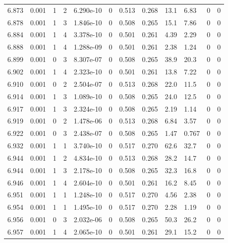 \documentclass[preview]{standalone}
\begin{document}
{{{{{{{{{{{{{{{{{{{\begin{tabular}{L{1.2cm}C{1.2cm} C{0.3cm}C{0.5cm} C{1.4cm}C{1.4cm} C{1.4cm}C{1.4cm} C{1.6cm}C{1.6cm} C{1.6cm}C{1.6cm}}
  6.873  &  0.001  & 1     &  2 &  6.290e-10  & 0  &  0.513&   0.268& 13.1 & 6.83   &  0 & 0  \\ 
  6.878  &  0.001  & 1     &  3 &  1.846e-10  & 0  &  0.508&   0.265& 15.1 & 7.86   &  0 & 0  \\ 
  6.884  &  0.001  & 1     &  4 &  3.378e-10  & 0  &  0.501&   0.261& 4.39 & 2.29   &  0 & 0  \\ 
  6.888  &  0.001  & 1     &  4 &  1.288e-09  & 0  &  0.501&   0.261& 2.38 & 1.24   &  0 & 0  \\ 
  6.899  &  0.001  & 0     &  3 &  8.307e-07  & 0  &  0.508&   0.265& 38.9 & 20.3   &  0 & 0  \\ 
  6.902  &  0.001  & 1     &  4 &  2.323e-10  & 0  &  0.501&   0.261& 13.8 & 7.22   &  0 & 0  \\ 
  6.910  &  0.001  & 0     &  2 &  2.504e-07  & 0  &  0.513&   0.268& 22.0 & 11.5   &  0 & 0  \\ 
  6.914  &  0.001  & 1     &  3 &  1.089e-10  & 0  &  0.508&   0.265& 24.0 & 12.5   &  0 & 0  \\ 
  6.917  &  0.001  & 1     &  3 &  2.324e-10  & 0  &  0.508&   0.265& 2.19 & 1.14   &  0 & 0  \\ 
  6.919  &  0.001  & 0     &  2 &  1.478e-06  & 0  &  0.513&   0.268& 6.84 & 3.57   &  0 & 0  \\ 
  6.922  &  0.001  & 0     &  3 &  2.438e-07  & 0  &  0.508&   0.265& 1.47 & 0.767   &  0 & 0  \\ 
  6.932  &  0.001  & 1     &  1 &  3.740e-10  & 0  &  0.517&   0.270& 62.6 & 32.7   &  0 & 0  \\ 
  6.944  &  0.001  & 1     &  2 &  4.834e-10  & 0  &  0.513&   0.268& 28.2 & 14.7   &  0 & 0  \\ 
  6.944  &  0.001  & 1     &  3 &  2.178e-10  & 0  &  0.508&   0.265& 32.3 & 16.8   &  0 & 0  \\ 
  6.946  &  0.001  & 1     &  4 &  2.604e-10  & 0  &  0.501&   0.261& 16.2 & 8.45   &  0 & 0  \\ 
  6.951  &  0.001  & 1     &  1 &  1.248e-10  & 0  &  0.517&   0.270& 4.56 & 2.38   &  0 & 0  \\ 
  6.954  &  0.001  & 1     &  1 &  1.495e-10  & 0  &  0.517&   0.270& 2.28 & 1.19   &  0 & 0  \\ 
  6.956  &  0.001  & 0     &  3 &  2.032e-06  & 0  &  0.508&   0.265& 50.3 & 26.2   &  0 & 0  \\ 
  6.957  &  0.001  & 1     &  4 &  2.065e-10  & 0  &  0.501&   0.261& 29.1 & 15.2   &  0 & 0  \\ 

\end{tabular}}}}}}}}}}}}}}}}}}}}
\end{document}
